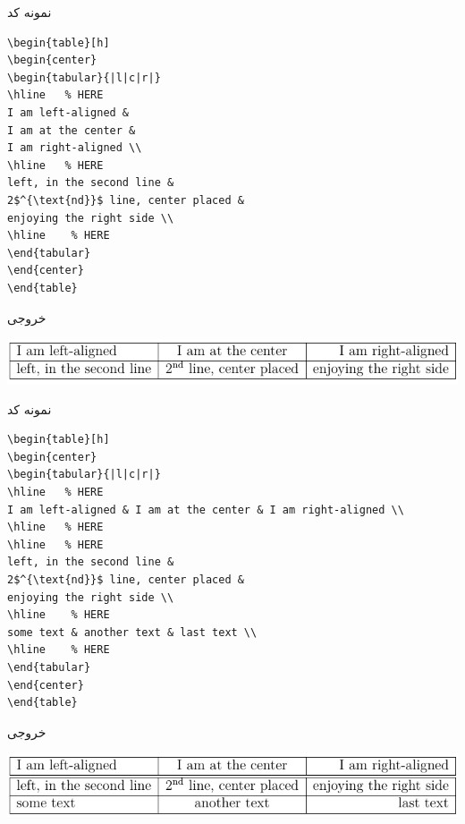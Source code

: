 \begin{frame}[fragile]{نمونه کد}
\begin{latin}
\begin{lstlisting}[keywords={begin, end}, keywordstyle=\color{Mulberry}\textbf]
\begin{table}[h]
\begin{center}
\begin{tabular}{|l|c|r|}   
\hline   % HERE
I am left-aligned & 
I am at the center & 
I am right-aligned \\
\hline   % HERE
left, in the second line &
2$^{\text{nd}}$ line, center placed &
enjoying the right side \\
\hline    % HERE
\end{tabular}
\end{center}
\end{table}
\end{lstlisting}
\end{latin}
\end{frame}

\begin{frame}{خروجی}
\begin{center}
\includegraphics[width=\textwidth]{docs/images/fmlhline}
\end{center}
\end{frame}

\begin{frame}[fragile]{نمونه کد}
\begin{latin}
\begin{lstlisting}[keywords={begin, end}, keywordstyle=\color{Mulberry}\textbf]
\begin{table}[h]
\begin{center}
\begin{tabular}{|l|c|r|}   
\hline   % HERE
I am left-aligned & I am at the center & I am right-aligned \\
\hline   % HERE
\hline   % HERE
left, in the second line &
2$^{\text{nd}}$ line, center placed &
enjoying the right side \\
\hline    % HERE
some text & another text & last text \\
\hline    % HERE
\end{tabular}
\end{center}
\end{table}
\end{lstlisting}
\end{latin}
\end{frame}

\begin{frame}{خروجی}
\begin{center}
\includegraphics[width=\textwidth]{docs/images/twohline}
\end{center}
\end{frame}
